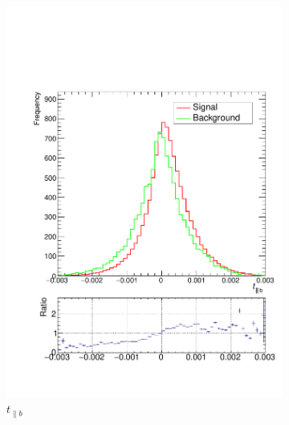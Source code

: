 \documentclass[10pt,a4paper]{book}
\begin{document}
\begin{figure}
\begin{subfigure}{.33\textwidth}
\includegraphics[scale=0.25]{truth/tpar2}
\caption{$t_{\parallel b}$}
\end{subfigure}
\begin{subfigure}{0.33\textwidth}
\centering

\end{subfigure}
\end{figure}
\end{document}
